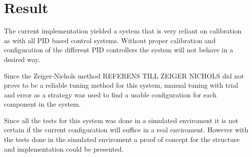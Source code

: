 \section{Result}\label{sec:result}

The current implementation yielded a system that is very reliant on calibration as with all PID based control systems. Without proper calibration and configuration of the different PID controllers the system will not behave in a desired way. 

Since the Zeiger-Nichols method REFERENS TILL ZEIGER NICHOLS did not prove to be a reliable tuning method for this system, manual tuning with trial and error as a strategy was used to find a usable configuration for each component in the system.

Since all the tests for this system was done in a simulated enviroment it is not certain if the current configuration will suffice in a real enviroment. However with the tests done in the simulated enviroment a proof of concept for the structure and implementation could be presented.
